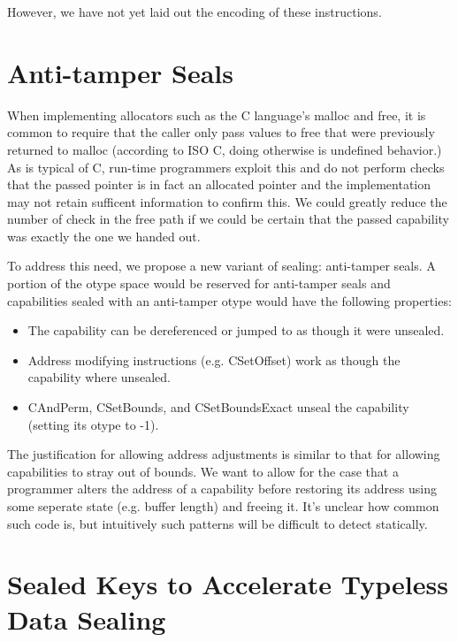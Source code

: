 However, we have not yet laid out the encoding of these instructions.

\section{Anti-tamper Seals}
\label{sec:anti-tamper}

When implementing allocators such as the C language's malloc and free,
it is common to require that the caller only pass values to free that
were previously returned to malloc (according to ISO C, doing otherwise
is undefined behavior.)
As is typical of C, run-time programmers exploit this and do not perform
checks that the passed pointer is in fact an allocated pointer and the
implementation may not retain sufficent information to confirm this.
We could greatly reduce the number of check in the free path if we could
be certain that the passed capability was exactly the one we handed out.

To address this need, we propose a new variant of sealing: anti-tamper seals.
A portion of the otype space would be reserved for anti-tamper seals
and capabilities sealed with an anti-tamper otype would have the following
properties:
\begin{itemize}
  \item The capability can be dereferenced or jumped to as though it were
  unsealed.
%
  \item Address modifying instructions (e.g. CSetOffset) work as though
  the capability where unsealed.
%
  \item CAndPerm, CSetBounds, and CSetBoundsExact unseal the capability
  (setting its otype to -1).
\end{itemize}

The justification for allowing address adjustments is similar to that
for allowing capabilities to stray out of bounds.
We want to allow for the case that a programmer alters the address
of a capability before restoring its address using some seperate state
(e.g. buffer length) and freeing it.
It's unclear how common such code is, but intuitively such patterns
will be difficult to detect statically.

\section{Sealed Keys to Accelerate Typeless Data Sealing}

